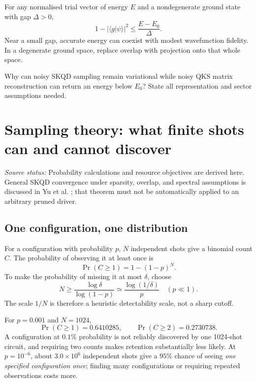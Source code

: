 \documentclass[11pt,a4paper,oneside]{report}
\newcommand{\braket}[2]{\langle #1\vert #2\rangle}
\newcommand{\abs}[1]{\left\lvert #1\right\rvert}
\newcommand{\src}[1]{\par{\small\color{grey}\textit{Source status:} #1}\par}
\newcommand{\checkpoint}[1]{\begin{idea}[Check your understanding]#1\end{idea}}
\begin{document}
For any normalised trial vector of energy $E$ and a nondegenerate ground state with gap $\Delta>0$,
\begin{equation}
1-\abs{\braket g\psi}^2\le\frac{E-E_0}{\Delta}.
\end{equation}
Near a small gap, accurate energy can coexist with modest wavefunction fidelity. In a degenerate ground space, replace overlap with projection onto that whole space.

\checkpoint{Why can noisy SKQD sampling remain variational while noisy QKS matrix reconstruction can return an energy below $E_0$? State all representation and sector assumptions needed.}

\chapter{Sampling theory: what finite shots can and cannot discover}\label{ch:sampling}
\src{Probability calculations and resource objectives are derived here. General SKQD convergence under sparsity, overlap, and spectral assumptions is discussed in Yu et al. \cite{yu}; that theorem must not be automatically applied to an arbitrary pruned driver.}

\section{One configuration, one distribution}
For a configuration with probability $p$, $N$ independent shots give a binomial count $C$. The probability of observing it at least once is
\begin{equation}
\Pr(C\ge1)=1-(1-p)^N.
\end{equation}
To make the probability of missing it at most $\delta$, choose
\begin{equation}
N\ge\frac{\log\delta}{\log(1-p)}\simeq\frac{\log(1/\delta)}p\quad(p\ll1).
\end{equation}
The scale $1/N$ is therefore a heuristic detectability scale, not a sharp cutoff.

For $p=0.001$ and $N=1024$,
\begin{equation}
\Pr(C\ge1)=0.6410285,\qquad\Pr(C\ge2)=0.2730738.
\end{equation}
A configuration at $0.1\%$ probability is not reliably discovered by one 1024-shot circuit, and requiring two counts makes retention substantially less likely. At $p=10^{-6}$, about $3.0\times10^6$ independent shots give a $95\%$ chance of seeing \emph{one specified configuration once}; finding many configurations or requiring repeated observations costs more.
\end{document}
